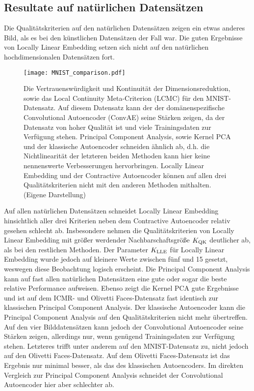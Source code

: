 \subsection{Resultate auf natürlichen Datensätzen}
\label{ch:Vergleich:sec:Resultate:natuerlich}

Die Qualitätskriterien auf den natürlichen Datensätzen zeigen ein etwas anderes Bild, als es bei
den künstlichen Datensätzen der Fall war. Die guten Ergebnisse von Locally Linear Embedding setzen
sich nicht auf den natürlichen hochdimensionalen Datensätzen fort.
\begin{figure}[ht]
	\begin{center}
		\texttt{[image: MNIST\_comparison.pdf]}
	\end{center}
	\caption[Qualitätskriterien für MNIST]{Die Vertrauenswürdigkeit und Kontinuität der Dimensionsreduktion, sowie das Local Continuity Meta-Criterion (LCMC) für den MNIST-Datensatz. Auf diesem Datensatz kann der der domänenspezifische Convolutional Autoencoder (ConvAE) seine Stärken zeigen, da der Datensatz von hoher Qualität ist und viele Trainingsdaten zur Verfügung stehen. Principal Component Analysis, sowie Kernel PCA und der klassische Autoencoder schneiden ähnlich ab, d.h. die Nichtlinearität der letzteren beiden Methoden kann hier keine nennenswerte Verbesserungen hervorbringen. Locally Linear Embedding und der Contractive Autoencoder können auf allen drei Qualitätskriterien nicht mit den anderen Methoden mithalten. (Eigene Darstellung)}
	\label{fig:MNISTMetrics}
\end{figure}
Auf allen natürlichen Datensätzen
schneidet Locally Linear Embedding hinsichtlich aller drei Kriterien neben dem Contractive Autoencoder relativ gesehen schlecht ab. Insbesondere nehmen die
Qualitätskriterien von Locally Linear Embedding mit größer werdender Nachbarschaftsgröße $K_{\text{QK}}$ deutlicher ab, als bei den
restlichen Methoden. Der Parameter $K_{\text{LLE}}$ für Locally Linear Embedding wurde jedoch auf kleinere Werte zwischen fünf und 15 gesetzt, weswegen diese Beobachtung logisch erscheint. Die Principal Component Analysis kann auf fast allen natürlichen Datensätzen eine gute oder sogar die
beste relative Performance aufweisen. Ebenso zeigt die Kernel PCA gute Ergebnisse und ist auf dem ICMR- und Olivetti Faces-Datensatz fast identisch zur klassischen Principal Component Analysis. Der klassische Autoencoder kann die Principal Component Analysis auf den Qualitätskriterien nicht mehr übertreffen. Auf den vier Bilddatensätzen kann jedoch der Convolutional
Autoencoder seine Stärken zeigen, allerdings nur, wenn genügend Trainingsdaten zur Verfügung stehen. Letzteres trifft unter anderem auf den MNIST-Datensatz zu, nicht jedoch auf den Olivetti Faces-Datensatz. Auf dem Olivetti Faces-Datensatz ist das Ergebnis nur minimal besser, als das des klassischen Autoencoders. Im direkten Vergleich zur Principal Component Analysis schneidet der Convolutional Autoencoder hier aber schlechter ab.
